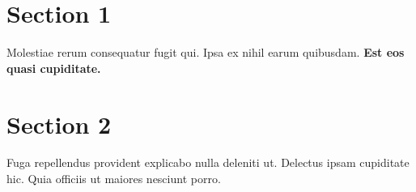 \documentclass{article}
\begin{document}
  \section{Section 1}
     Molestiae rerum consequatur fugit qui. Ipsa ex nihil earum quibusdam. \bf Est eos quasi cupiditate. 
  \section{Section 2}
     Fuga repellendus provident explicabo nulla deleniti ut. Delectus ipsam cupiditate hic. Quia officiis ut maiores nesciunt porro.
\end{document}
